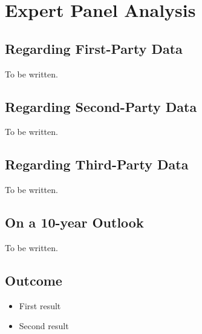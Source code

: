 %
%

\pagebreak
\section{Expert Panel Analysis}

\onehalfspacing

\subsection{Regarding First-Party Data}

To be written.

\subsection{Regarding Second-Party Data}

To be written.

\subsection{Regarding Third-Party Data}

To be written.

\subsection{On a 10-year Outlook}

To be written.

\subsection{Outcome}

\begin{itemize}
 \item First result
 \item Second result
\end{itemize}
